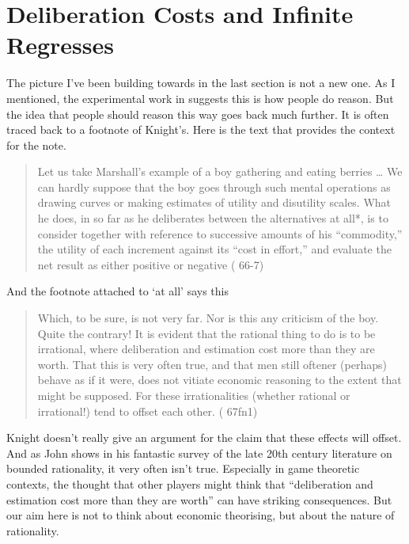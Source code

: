 \documentclass[11pt,]{book}
\begin{document}
\hypertarget{deliberationcosts}{%
\section{Deliberation Costs and Infinite Regresses}\label{deliberationcosts}}

The picture I've been building towards in the last section is not a new one. As I mentioned, the experimental work in \citeyearpar{Reutskaja2011} suggests this is how people do reason. But the idea that people should reason this way goes back much further. It is often traced back to a footnote of Knight's. Here is the text that provides the context for the note.

\begin{quote}
Let us take Marshall's example of a boy gathering and eating berries \ldots{} We can hardly suppose that the boy goes through such mental operations as drawing curves or making estimates of utility and disutility scales. What he does, in so far as he deliberates between the alternatives at all*, is to consider together with reference to successive amounts of his ``commodity,'' the utility of each increment against its ``cost in effort,'' and evaluate the net result as either positive or negative (\citet{Knight1921} 66-7)
\end{quote}

And the footnote attached to `at all' says this

\begin{quote}
Which, to be sure, is not very far. Nor is this any criticism of the boy. Quite the contrary! It is evident that the rational thing to do is to be irrational, where deliberation and estimation cost more than they are worth. That this is very often true, and that men still oftener (perhaps) behave as if it were, does not vitiate economic reasoning to the extent that might be supposed. For these irrationalities (whether rational or irrational!) tend to offset each other. (\citet{Knight1921} 67fn1)
\end{quote}

Knight doesn't really give an argument for the claim that these effects will offset. And as John \citet{Conlisk1996} shows in his fantastic survey of the late 20th century literature on bounded rationality, it very often isn't true. Especially in game theoretic contexts, the thought that other players might think that ``deliberation and estimation cost more than they are worth'' can have striking consequences. But our aim here is not to think about economic theorising, but about the nature of rationality.
\end{document}
